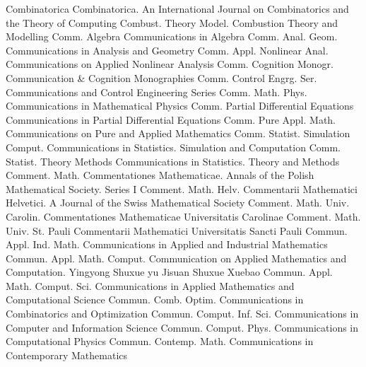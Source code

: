 {Combinatorica}
{Combinatorica. An International Journal on Combinatorics and the Theory of Computing}
{Combust. Theory Model.}
{Combustion Theory and Modelling}
{Comm. Algebra}
{Communications in Algebra}
{Comm. Anal. Geom.}
{Communications in Analysis and Geometry}
{Comm. Appl. Nonlinear Anal.}
{Communications on Applied Nonlinear Analysis}
{Comm. Cognition Monogr.}
{Communication & Cognition Monographies}
{Comm. Control Engrg. Ser.}
{Communications and Control Engineering Series}
{Comm. Math. Phys.}
{Communications in Mathematical Physics}
{Comm. Partial Differential Equations}
{Communications in Partial Differential Equations}
{Comm. Pure Appl. Math.}
{Communications on Pure and Applied Mathematics}
{Comm. Statist. Simulation Comput.}
{Communications in Statistics. Simulation and Computation}
{Comm. Statist. Theory Methods}
{Communications in Statistics. Theory and Methods}
{Comment. Math.}
{Commentationes Mathematicae. Annals of the Polish Mathematical Society. Series I}
{Comment. Math. Helv.}
{Commentarii Mathematici Helvetici. A Journal of the Swiss Mathematical Society}
{Comment. Math. Univ. Carolin.}
{Commentationes Mathematicae Universitatis Carolinae}
{Comment. Math. Univ. St. Pauli}
{Commentarii Mathematici Universitatis Sancti Pauli}
{Commun. Appl. Ind. Math.}
{Communications in Applied and Industrial Mathematics}
{Commun. Appl. Math. Comput.}
{Communication on Applied Mathematics and Computation. Yingyong Shuxue yu Jisuan Shuxue Xuebao}
{Commun. Appl. Math. Comput. Sci.}
{Communications in Applied Mathematics and Computational Science}
{Commun. Comb. Optim.}
{Communications in Combinatorics and Optimization}
{Commun. Comput. Inf. Sci.}
{Communications in Computer and Information Science}
{Commun. Comput. Phys.}
{Communications in Computational Physics}
{Commun. Contemp. Math.}
{Communications in Contemporary Mathematics}
